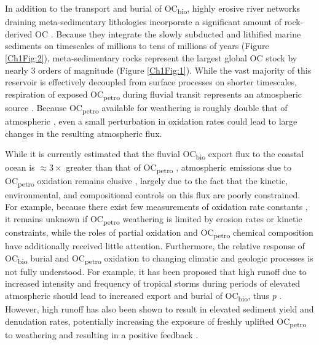 In addition to the transport and burial of OC\textsubscript{bio}, highly erosive river networks draining meta-sedimentary lithologies incorporate a significant amount of rock-derived OC \citep[OC\textsubscript{petro}; \textit{e.g.}][]{Hilton:2011jw,Galy:2015fx}. Because they integrate the slowly subducted and lithified marine sediments on timescales of millions to tens of millions of years (Figure \ref{Ch1Fig:2}), meta-sedimentary rocks represent the largest global OC stock by nearly $3$ orders of magnitude (Figure \ref{Ch1Fig:1}). While the vast majority of this reservoir is effectively decoupled from surface processes on shorter timescales, respiration of exposed OC\textsubscript{petro} during fluvial transit represents an atmospheric  source \citep{Galy:2008ff,Bouchez:2010if,Hilton:2014dh}. Because OC\textsubscript{petro} available for weathering is roughly double that of atmospheric  \citep[\textit{i.e.} 1100 PgC in the upper $1$ m;][]{Copard:2007bf}, even a small perturbation in oxidation rates could lead to large changes in the resulting atmospheric  flux. 

While it is currently estimated that the fluvial OC\textsubscript{bio} export flux to the coastal ocean is $\approx 3\times$ greater than that of OC\textsubscript{petro} \citep{Galy:2015fx}, atmospheric  emissions due to OC\textsubscript{petro} oxidation remains elusive \citep{Galy:2008ff,Bouchez:2010if,Hilton:2014dh}, largely due to the fact that the kinetic, environmental, and compositional controls on this flux are poorly constrained. For example, because there exist few measurements of oxidation rate constants \citep{Chang:1999vo}, it remains unknown if OC\textsubscript{petro} weathering is limited by erosion rates or kinetic constraints, while the roles of partial oxidation \citep{Schillawski:2008ko} and OC\textsubscript{petro} chemical composition \citep{Galy:2008ff} have additionally received little attention. Furthermore, the relative response of OC\textsubscript{bio} burial and OC\textsubscript{petro} oxidation to changing climatic and geologic processes is not fully understood. For example, it has been proposed that high runoff due to increased intensity and frequency of tropical storms during periods of elevated atmospheric  should lead to increased export and burial of OC\textsubscript{bio}, thus  \textit{p} \citep[\textit{i.e.} a negative feedback loop;][]{Hilton:2008fo}. However, high runoff has also been shown to result in elevated sediment yield and denudation rates, potentially increasing the exposure of freshly uplifted OC\textsubscript{petro} to weathering and resulting in a positive feedback \citep{Hilton:2014dh}.

